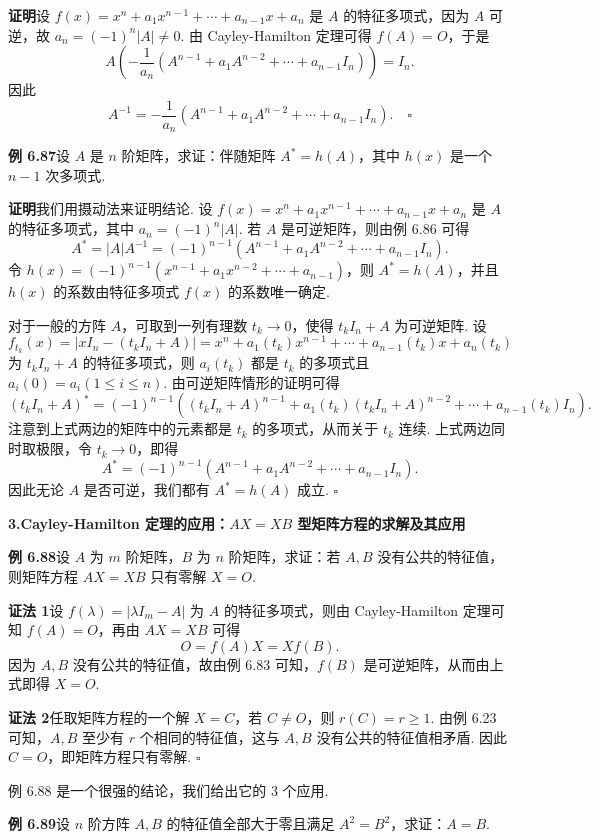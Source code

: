 \documentclass[UTF8,12pt,a4paper,fontset=fandol]{ctexart}
\begin{document}
\noindent\textbf{证明}\quad 设 $f(x)=x^n+a_1x^{n-1}+\cdots+a_{n-1}x+a_n$ 是 $A$ 的特征多项式，因为 $A$ 可逆，故 $a_n=(-1)^n|A|\ne 0$. 由 Cayley-Hamilton 定理可得 $f(A)=O$，于是
\[
A\left(-\frac{1}{a_n}(A^{n-1}+a_1A^{n-2}+\cdots+a_{n-1}I_n)\right)=I_n.
\]
因此
\[
A^{-1}=-\frac{1}{a_n}(A^{n-1}+a_1A^{n-2}+\cdots+a_{n-1}I_n). \quad \square
\]

\noindent\textbf{例 6.87}\quad 设 $A$ 是 $n$ 阶矩阵，求证：伴随矩阵 $A^*=h(A)$，其中 $h(x)$ 是一个 $n-1$ 次多项式.

\noindent\textbf{证明}\quad 我们用摄动法来证明结论. 设 $f(x)=x^n+a_1x^{n-1}+\cdots+a_{n-1}x+a_n$ 是 $A$ 的特征多项式，其中 $a_n=(-1)^n|A|$. 若 $A$ 是可逆矩阵，则由例 6.86 可得
\[
A^*=|A|A^{-1}=(-1)^{n-1}(A^{n-1}+a_1A^{n-2}+\cdots+a_{n-1}I_n).
\]
令 $h(x)=(-1)^{n-1}(x^{n-1}+a_1x^{n-2}+\cdots+a_{n-1})$，则 $A^*=h(A)$，并且 $h(x)$ 的系数由特征多项式 $f(x)$ 的系数唯一确定.

对于一般的方阵 $A$，可取到一列有理数 $t_k\to 0$，使得 $t_kI_n+A$ 为可逆矩阵. 设
\[
f_{t_k}(x)=|xI_n-(t_kI_n+A)|=x^n+a_1(t_k)x^{n-1}+\cdots+a_{n-1}(t_k)x+a_n(t_k)
\]
为 $t_kI_n+A$ 的特征多项式，则 $a_i(t_k)$ 都是 $t_k$ 的多项式且 $a_i(0)=a_i(1\le i\le n)$. 由可逆矩阵情形的证明可得
\[
(t_kI_n+A)^*=(-1)^{n-1}\left((t_kI_n+A)^{n-1}+a_1(t_k)(t_kI_n+A)^{n-2}+\cdots+a_{n-1}(t_k)I_n\right).
\]
注意到上式两边的矩阵中的元素都是 $t_k$ 的多项式，从而关于 $t_k$ 连续. 上式两边同时取极限，令 $t_k\to 0$，即得
\[
A^*=(-1)^{n-1}(A^{n-1}+a_1A^{n-2}+\cdots+a_{n-1}I_n).
\]
因此无论 $A$ 是否可逆，我们都有 $A^*=h(A)$ 成立. $\square$

\noindent\textbf{3.\quad Cayley-Hamilton 定理的应用：$AX=XB$ 型矩阵方程的求解及其应用}

\noindent\textbf{例 6.88}\quad 设 $A$ 为 $m$ 阶矩阵，$B$ 为 $n$ 阶矩阵，求证：若 $A,B$ 没有公共的特征值，则矩阵方程 $AX=XB$ 只有零解 $X=O$.

\noindent\textbf{证法 1}\quad 设 $f(\lambda)=|\lambda I_m-A|$ 为 $A$ 的特征多项式，则由 Cayley-Hamilton 定理可知 $f(A)=O$，再由 $AX=XB$ 可得
\[
O=f(A)X=Xf(B).
\]
因为 $A,B$ 没有公共的特征值，故由例 6.83 可知，$f(B)$ 是可逆矩阵，从而由上式即得 $X=O$.

\noindent\textbf{证法 2}\quad 任取矩阵方程的一个解 $X=C$，若 $C\ne O$，则 $r(C)=r\ge 1$. 由例 6.23 可知，$A,B$ 至少有 $r$ 个相同的特征值，这与 $A,B$ 没有公共的特征值相矛盾. 因此 $C=O$，即矩阵方程只有零解. $\square$

例 6.88 是一个很强的结论，我们给出它的 $3$ 个应用.

\noindent\textbf{例 6.89}\quad 设 $n$ 阶方阵 $A,B$ 的特征值全部大于零且满足 $A^2=B^2$，求证：$A=B$.
\end{document}

